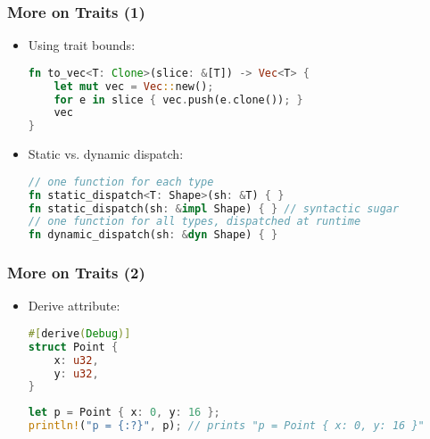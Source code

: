 \begin{frame}[fragile]
    \frametitle{More on Traits (1)}

    \begin{itemize}
        \item Using trait bounds:
        \begin{lstlisting}[language=rust]
fn to_vec<T: Clone>(slice: &[T]) -> Vec<T> {
    let mut vec = Vec::new();
    for e in slice { vec.push(e.clone()); }
    vec
}
        \end{lstlisting}

        \pause

        \item Static vs. dynamic dispatch:
        \begin{lstlisting}[language=rust]
// one function for each type
fn static_dispatch<T: Shape>(sh: &T) { }
fn static_dispatch(sh: &impl Shape) { } // syntactic sugar
// one function for all types, dispatched at runtime
fn dynamic_dispatch(sh: &dyn Shape) { }
        \end{lstlisting}
    \end{itemize}
\end{frame}

\begin{frame}[fragile]
    \frametitle{More on Traits (2)}

    \begin{itemize}
        \item Derive attribute:
        \begin{lstlisting}[language=rust]
#[derive(Debug)]
struct Point {
    x: u32,
    y: u32,
}
        \end{lstlisting}

        \pause

        \begin{lstlisting}[language=rust]
let p = Point { x: 0, y: 16 };
println!("p = {:?}", p); // prints "p = Point { x: 0, y: 16 }"
        \end{lstlisting}
    \end{itemize}
\end{frame}


